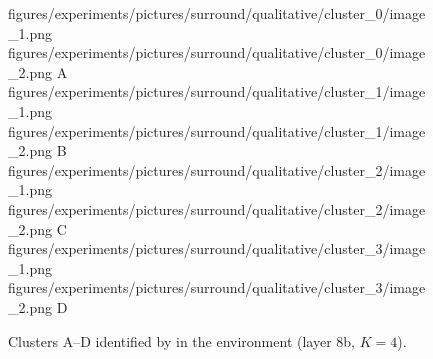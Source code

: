 \begin{figure}[H]
    \qualitativeClusterFigureSetup
    \qualitativeClusterTwo
        {figures/experiments/pictures/surround/qualitative/cluster_0/image_1.png}
        {figures/experiments/pictures/surround/qualitative/cluster_0/image_2.png}
        {A}
    \qualitativeClusterTwo
        {figures/experiments/pictures/surround/qualitative/cluster_1/image_1.png}
        {figures/experiments/pictures/surround/qualitative/cluster_1/image_2.png}
        {B}
    \qualitativeClusterTwo
        {figures/experiments/pictures/surround/qualitative/cluster_2/image_1.png}
        {figures/experiments/pictures/surround/qualitative/cluster_2/image_2.png}
        {C}
    \qualitativeClusterTwo
        {figures/experiments/pictures/surround/qualitative/cluster_3/image_1.png}
        {figures/experiments/pictures/surround/qualitative/cluster_3/image_2.png}
        {D}
    \caption{Clusters A--D identified by  in the \SurroundName environment (layer 8b, $K=4$).}
    \label{fig:qualitative_surround}
\end{figure}
